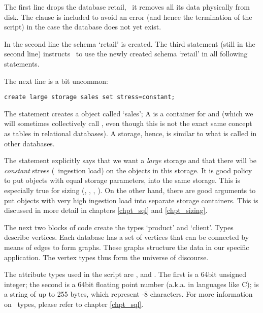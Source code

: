 The first line drops the database retail,
\ie\ it removes all its data physically
from disk. The  clause
is included to avoid an error 
(and hence the termination of the script)
in the case
the database does not yet exist.

In the second line the schema `retail'
is created.
The third statement (still in the second line)
instructs \nowdb\ to use the newly created
schema `retail' in all following statements.

The next line is a bit uncommon:

\begin{sqlcode}
\begin{lstlisting}
create large storage sales set stress=constant;
\end{lstlisting}
\end{sqlcode}

The statement creates a  object called `sales';
A  is a container for 
 and 
(which we will sometimes collectively call ,
even though this is not the exact same concept
as tables in relational databases).
A storage, hence, is similar to what is called
 in other databases.

The statement explicitly says that we
want a \emph{large} storage and that there
will be \emph{constant} stress (\ie\ ingestion load)
on the objects in this storage.
It is good policy to put objects with equal
storage parameters,
into the same storage. This is especially true for sizing
(, , , \etc).
On the other hand, there are good arguments to
put objects with very high ingestion load into
separate storage containers. This is discussed
in more detail in chapters \ref{chpt_sql} and
\ref{chpt_sizing}.

The next two blocks of code create the types
`product' and `client'.
Types describe vertices.
Each database has a set
of vertices that can be connected
by means of edges to form graphs.
These graphs structure the data
in our specific application.
The vertex types thus form
the universe of discourse.

The attribute types used in the script
are ,  and .
The first is a 64bit unsigned integer;
the second is a 64bit floating point number
(a.k.a.  in languages like C);
 is a string of up to 255 bytes,
which represent -8 characters.
For more information on \sql\ types,
please refer to chapter
\ref{chpt_sql}.

